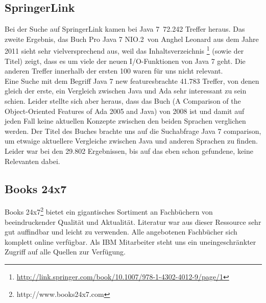 \subsection{SpringerLink}
Bei der Suche auf SpringerLink kamen bei \glqq Java 7\grqq~72.242 Treffer heraus. Das zweite Ergebnis, das Buch \glqq Pro Java 7
NIO.2\grqq\cite{proJava7}~von Anghel Leonard aus dem Jahre 2011 sieht sehr vielversprechend aus, weil das Inhaltsverzeichnis
\footnote{\url{http://link.springer.com/book/10.1007/978-1-4302-4012-9/page/1}} (sowie der Titel) zeigt, dass es um viele der neuen
I/O-Funktionen von Java 7 geht.
Die anderen Treffer innerhalb der ersten 100 waren für uns nicht relevant.\\

Eine Suche mit dem Begriff \glqq Java 7 new features\grqq brachte 41.783 Treffer, von denen gleich der erste, ein Vergleich zwischen
Java und Ada sehr interessant zu sein schien. Leider stellte sich aber heraus, dass das Buch 
(\glqq A Comparison of the Object-Oriented Features of Ada 2005 and Java\grqq\cite{adacomparison}) von 2008 ist 
und damit auf jeden Fall keine aktuellen Konzepte zwischen den beiden Sprachen verglichen werden.
Der Titel des Buches brachte uns auf die Suchabfrage \glqq Java 7 comparison\grqq, um etwaige aktuellere Vergleiche zwischen
Java und anderen Sprachen zu finden. Leider war bei den 29.802 Ergebnissen, bis auf das eben schon gefundene, keine Relevanten
dabei.

%

\subsection{Books 24x7}
Books 24x7\footnote{http://www.books24x7.com} bietet ein gigantisches Sortiment an Fachbüchern von beeindruckender Qualität und Aktualität. Literatur war aus dieser Ressource sehr gut auffindbar und leicht zu verwenden. Alle angebotenen Fachbücher sich komplett online verfügbar. Als IBM Mitarbeiter steht uns ein uneingeschränkter Zugriff auf alle Quellen zur Verfügung.\\

